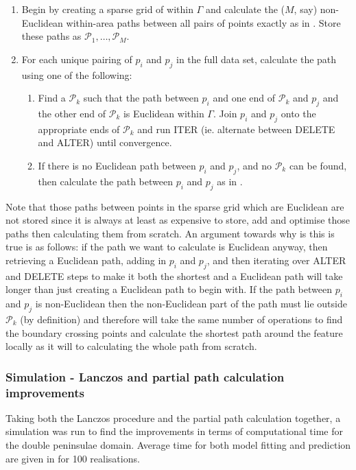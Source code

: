 \begin{enumerate}
 \item Begin by creating a sparse grid of within $\Gamma$ and calculate the ($M$, say) non-Euclidean within-area paths between all pairs of points exactly as in . Store these paths as $\mathcal{P}_1,\ldots, \mathcal{P}_M$.
\item For each unique pairing of $p_i$ and $p_j$ in the full data set, calculate the path using one of the following:
	\begin{enumerate}
	\item Find a $\mathcal{P}_k$ such that the path between $p_i$ and one end of $\mathcal{P}_k$ and $p_j$ and the other end of $\mathcal{P}_k$ is Euclidean within $\Gamma$. Join $p_i$ and $p_j$ onto the appropriate ends of $\mathcal{P}_k$ and run ITER (ie. alternate between DELETE and ALTER) until convergence.
	\item If there is no Euclidean path between $p_i$ and $p_j$, and no $\mathcal{P}_k$ can be found, then calculate the path between $p_i$ and $p_j$ as in . 
	\end{enumerate}
\end{enumerate}

Note that those paths between points in the sparse grid which are Euclidean are not stored since it is always at least as expensive to store, add and optimise those paths then calculating them from scratch. An argument towards why is this is true is as follows: if the path we want to calculate is Euclidean anyway, then retrieving a Euclidean path, adding in $p_i$ and $p_j$, and then iterating over ALTER and DELETE steps to make it both the shortest and a Euclidean path will take longer than just creating a Euclidean path to begin with. If the path between $p_i$ and $p_j$ is non-Euclidean then the non-Euclidean part of the path must lie outside $\mathcal{P}_k$ (by definition) and therefore will take the same number of operations to find the boundary crossing points and calculate the shortest path around the feature locally as it will to calculating the whole path from scratch.


\subsubsection{Simulation - Lanczos and partial path calculation improvements}

Taking both the Lanczos procedure and the partial path calculation together, a simulation was run to find the improvements in terms of computational time for the double peninsulae domain. Average time for both model fitting and prediction are given in  for 100 realisations. 

